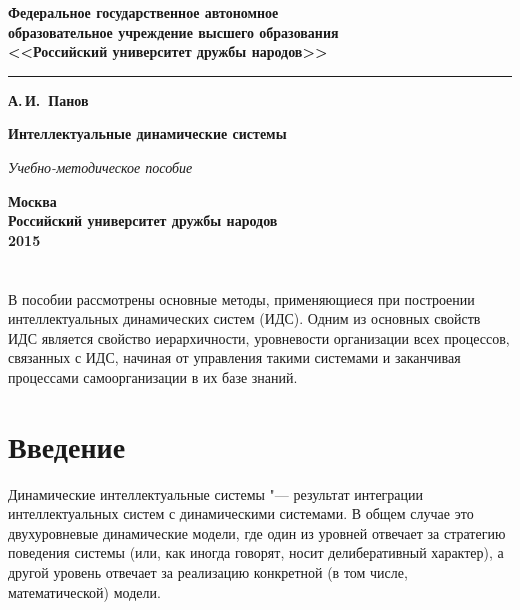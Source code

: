 \documentclass[b5paper,11pt]{book}
\numberwithin{Def}{section}
\numberwithin{Th}{chapter}
\numberwithin{St}{chapter}
\begin{document}
	\begin{titlepage}
		\begin{center}
			{\bfseries  Федеральное государственное автономное \\
				образовательное учреждение высшего образования\\
				<<Российский университет дружбы народов>>
				
			}

			\vspace{-5pt}
			\noindent\rule{\textwidth}{2pt}
			
			\vspace{50pt}
			{\Large\bfseries А.\,И.~Панов}
			
			\vspace{100pt}
			{\Huge\bfseries Интеллектуальные динамические системы}
			
			\vspace{20pt}
			{\Large\itshape Учебно-методическое пособие}
			
			\vfill
			{\bfseries Москва\\
				Российский университет дружбы народов\\
				2015
			}
		\end{center}
	\end{titlepage}
	
	\chapter*{}
	
	В пособии рассмотрены основные методы, применяющиеся при построении интеллектуальных динамических систем (ИДС). Одним из основных свойств ИДС является свойство иерархичности, уровневости организации всех процессов, связанных с ИДС, начиная от управления такими системами и заканчивая процессами самоорганизации в их базе знаний.
	
	
	\tableofcontents %
		
	\chapter*{Введение}
	Динамические интеллектуальные системы "--- результат интеграции интеллектуальных систем с динамическими системами. В общем случае это двухуровневые динамические модели, где один из уровней отвечает за стратегию поведения системы (или, как иногда говорят, носит делиберативный характер), а другой уровень отвечает за реализацию конкретной (в том числе, математической) модели.
	
\end{document}
